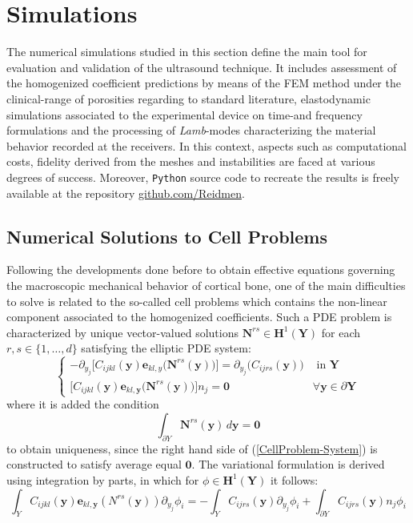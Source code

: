 \chapter{Simulations}
The numerical simulations studied in this section define the main tool for evaluation and validation of the ultrasound technique. It includes assessment of the homogenized coefficient predictions by means of the FEM method under the clinical-range of porosities regarding to standard literature, elastodynamic simulations associated to the experimental device on time-and frequency formulations and the processing of \textit{Lamb}-modes characterizing the material behavior recorded at the receivers. In this context, aspects such as computational costs, fidelity derived from the meshes and instabilities are faced at various degrees of success.
Moreover, \texttt{Python} source code to recreate the results is freely available at the repository \href{www.github.com/PublicMistakes/Codes}{github.com/Reidmen}.

\section{Numerical Solutions to Cell Problems}
Following the developments done before to obtain effective equations governing the macroscopic mechanical behavior of cortical bone, one of the main difficulties to solve is related to the so-called cell problems which contains the non-linear component associated to the homogenized coefficients.
Such a PDE problem is characterized by unique vector-valued solutions $\mathbf{N}^{rs} \in \mathbf{H}^1 (\mathbf{Y})$ for each $r,s \in \{1,\dots, d\}$ satisfying the elliptic PDE system:
\begin{equation}
    \label{CellProblem-System}
    \left \{
    \begin{array}{cc}
        - \partial_{y_j} \big[C_{ijkl}(\mathbf{y}) \mathbf{e}_{kl,y} \big( \mathbf{N}^{rs}(\mathbf{y}) \big)  \big] = \partial_{y_j} \big( C_{ijrs} (\mathbf{y}) \big)& \text{ in } \mathbf{Y} \\
        \big[ C_{ijkl}(\mathbf{y}) \mathbf{e}_{kl,\mathbf{y}}\big( \mathbf{N}^{rs}(\mathbf{y}) \big) \big]n_j = \mathbf{0} &  \forall \mathbf{y} \in \partial \mathbf{Y}
    \end{array}
    \right.
\end{equation}
where it is added the condition 
\begin{equation*}
    \int_{\partial Y} \mathbf{N}^{rs}(\mathbf{y}) \, d\mathbf{y} = \mathbf{0}
\end{equation*}
to obtain uniqueness, since the right hand side of (\ref{CellProblem-System}) is constructed to satisfy average equal $\mathbf{0}$.
The variational formulation is derived using integration by parts, in which for $\phi \in \mathbf{H}^1(\mathbf{Y})$ it follows:
\begin{equation*}
    \int_{Y} C_{ijkl}(\mathbf{y}) \mathbf{e}_{kl,\mathbf{y}}(N^{rs}(\mathbf{y})) \partial_{y_j}\phi_i = - \int_{Y}C_{ijrs}(\mathbf{y}) \partial_{y_j} \phi_i + \int_{\partial Y}C_{ijrs}(\mathbf{y}) n_j \phi_i
\end{equation*}

